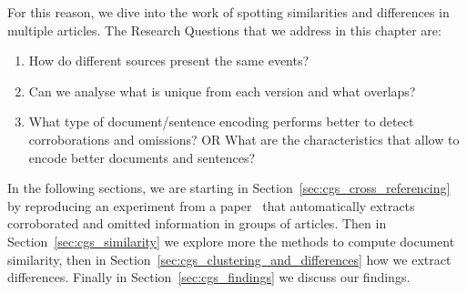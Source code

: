 For this reason, we dive into the work of spotting similarities and differences in multiple articles.
The Research Questions that we address in this chapter are: 
\begin{enumerate}
    \item How do different sources present the same events?
    \item Can we analyse what is unique from each version and what overlaps?
    \item What type of document/sentence encoding performs better to detect corroborations and omissions? OR What are the characteristics that allow to encode better documents and sentences?
\end{enumerate}





In the following sections, we are starting in Section~\ref{sec:cgs_cross_referencing} by reproducing an experiment from a paper~\citep{bountouridis2018explaining} that automatically extracts corroborated and omitted information in groups of articles. Then in Section~\ref{sec:cgs_similarity} we explore more the methods to compute document similarity, then in Section~\ref{sec:cgs_clustering_and_differences} how we extract differences. Finally in Section~\ref{sec:cgs_findings} we discuss our findings.














